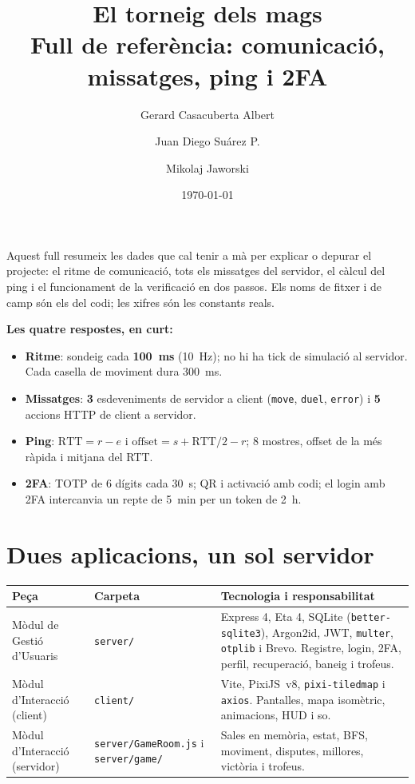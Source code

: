 \documentclass[10pt,a4paper]{article}
\title{\textbf{El torneig dels mags}\\[0.3em]
\large Full de referència: comunicació, missatges, ping i 2FA}
\author{Gerard Casacuberta Albert \and Juan Diego Suárez P. \and Mikolaj Jaworski}
\date{\today}
\begin{document}
\maketitle

Aquest full resumeix les dades que cal tenir a mà per explicar o depurar el projecte:
el ritme de comunicació, tots els missatges del servidor, el càlcul del ping i el
funcionament de la verificació en dos passos. Els noms de fitxer i de camp són els del
codi; les xifres són les constants reals.

\textbf{Les quatre respostes, en curt:}

\begin{itemize}[nosep]
  \item \textbf{Ritme}: sondeig cada \textbf{100~ms} (10~Hz); no hi ha tick de
        simulació al servidor. Cada casella de moviment dura 300~ms.
  \item \textbf{Missatges}: \textbf{3} esdeveniments de servidor a client
        (\texttt{move}, \texttt{duel}, \texttt{error}) i \textbf{5} accions HTTP de
        client a servidor.
  \item \textbf{Ping}: $\mathrm{RTT}=r-e$ i
        $\mathrm{offset}=s+\mathrm{RTT}/2-r$; 8 mostres, offset de la més ràpida i
        mitjana del RTT.
  \item \textbf{2FA}: TOTP de 6 dígits cada 30~s; QR i activació amb codi; el login
        amb 2FA intercanvia un repte de 5~min per un token de 2~h.
\end{itemize}

\section{Dues aplicacions, un sol servidor}

\begin{table}[ht]
\small
\begin{tabularx}{\textwidth}{@{}p{4.2cm}p{2.9cm}X@{}}
\toprule
\textbf{Peça} & \textbf{Carpeta} & \textbf{Tecnologia i responsabilitat} \\
\midrule
Mòdul de Gestió d'Usuaris & \texttt{server/} & Express 4, Eta 4, SQLite
(\texttt{better-sqlite3}), Argon2id, JWT, \texttt{multer}, \texttt{otplib} i Brevo.
Registre, login, 2FA, perfil, recuperació, baneig i trofeus. \\
Mòdul d'Interacció (client) & \texttt{client/} & Vite, PixiJS\ v8,
\texttt{pixi-tiledmap} i \texttt{axios}. Pantalles, mapa isomètric, animacions, HUD i
so. \\
Mòdul d'Interacció (servidor) & \texttt{server/GameRoom.js} i \texttt{server/game/} &
Sales en memòria, estat, BFS, moviment, disputes, millores, victòria i trofeus. \\
\bottomrule
\end{tabularx}
\end{table}
\end{document}
